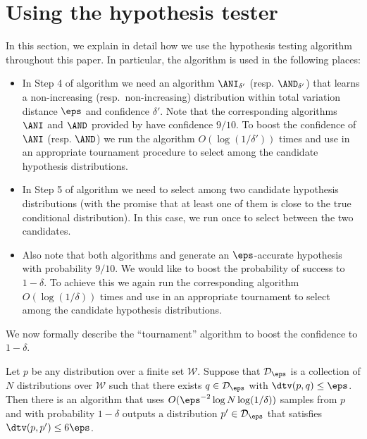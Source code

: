 \section{Using the hypothesis tester} \label{sec:ht}

In this section, we explain in detail how we use
the hypothesis testing algorithm 
throughout this paper. In particular, the algorithm
 is used in the following places:
\begin{itemize}

\item In Step 4 of algorithm \hyperref[alg:learn-kmodal-simple]{} we need
an algorithm $\ANI_{\delta'}$ (resp. $\AND_{\delta'}$) that learns
a non-increasing (resp.\ non-increasing) distribution within total variation distance
$\eps$ and confidence $\delta'$. Note that the corresponding algorithms
$\ANI$ and $\AND$ provided by  have confidence $9/10$.
To boost the confidence of $\ANI$ (resp. $\AND$)
we run the algorithm $O(\log(1/\delta'))$ times and use 
in an appropriate tournament procedure to select among the candidate hypothesis distributions.

\item In Step 5 of algorithm \hyperref[alg:learn-kmodal-simple]{} we need to
select among two candidate hypothesis distributions (with the
promise that at least one of them is close to the true
conditional distribution). In this case, we run  once to select between
the two candidates.

\item Also note that both algorithms \hyperref[alg:learn-kmodal-simple]{} and \hyperref[alg:learn-kmodal]{} generate
an $\eps$-accurate hypothesis with probability $9/10$. We would like to boost the probability
of success to $1-\delta$. To achieve this we again run the corresponding algorithm $O(\log(1/\delta))$
times and use  in an appropriate tournament
to select among the candidate hypothesis distributions.
\end{itemize}

We now formally describe the ``tournament'' algorithm to boost the confidence to $1-\delta$.

\begin{lemma} \label{lem:log-cover-size}
Let $p$ be any distribution over a finite set $\mathcal{W}$.
Suppose that ${\cal D}_\eps$ is a collection of $N$ distributions over $\mathcal{W}$ such that
there exists $q \in {\cal D}_\eps$ with $\dtv(p,q) \leq \eps$.
Then there is an algorithm that uses $O(\eps^{-2}\log N \log(1/\delta))$ samples from
$p$ and with probability $1-\delta$ outputs a distribution $p' \in {\cal D}_{\eps}$ that satisfies
$\dtv(p,p') \leq 6\eps$.
\end{lemma}


